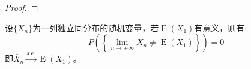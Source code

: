 \begin{proof}
\end{proof}

\begin{theorem}
	\label{theo:StrongLawOfLargeNumbers}
	设$\{X_n\}$为一列独立同分布的随机变量，若$\operatorname{E}(X_1)$有意义，则有:
	\begin{equation*}
		P\left(\left\{\lim_{n\to+\infty}\bar{X}_n\ne\operatorname{E}(X_1)\right\}\right)=0
	\end{equation*}
	即$\bar{X}_n\overset{\text{a.e.}}{\longrightarrow}\operatorname{E}(X_1)$。
\end{theorem}
